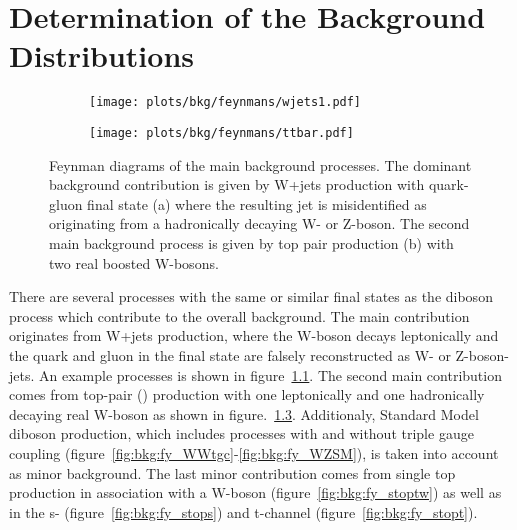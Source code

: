 \chapter{Determination of the Background Distributions}
\label{chap:bkg}
\begin{figure}[H!b]
	\centering
	\begin{subfigure}{0.4\textwidth}
		\texttt{[image: plots/bkg/feynmans/wjets1.pdf]}
		\caption{}
		\label{fig:bkg:fy_wjets1}
	\end{subfigure}
	\begin{subfigure}{0.4\textwidth}
		\texttt{[image: plots/bkg/feynmans/ttbar.pdf]}
		\caption{}
		\label{fig:bkg:fy_ttbar}
	\end{subfigure}
	\caption[Feynman diagrams of the main background processes]{Feynman diagrams of the main background processes. The dominant background contribution is given by W+jets production with quark-gluon final state (a) where the resulting jet is misidentified as originating from a hadronically decaying W- or Z-boson. The second main background process is given by top pair production (b) with two real boosted W-bosons.}
\end{figure}
There are several processes with the same or similar final states as the diboson process which contribute to the overall background. The main contribution originates from W+jets production, where the W-boson decays leptonically and the quark and gluon in the final state are falsely reconstructed as W- or Z-boson-jets. An example processes is shown in figure~\ref{fig:bkg:fy_wjets1}. The second main contribution comes from top-pair (\ttbar) production with one leptonically and one hadronically decaying real W-boson as shown in figure.~\ref{fig:bkg:fy_ttbar}. Additionaly, Standard Model diboson production, which includes processes with and without triple gauge coupling (figure~\ref{fig:bkg:fy_WWtgc}-\ref{fig:bkg:fy_WZSM}), is taken into account as minor background. The last minor contribution comes from single top production in association with a W-boson (figure~\ref{fig:bkg:fy_stoptw}) as well as in the s- (figure~\ref{fig:bkg:fy_stops}) and t-channel (figure~\ref{fig:bkg:fy_stopt}).\\
